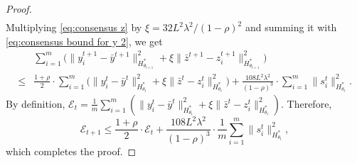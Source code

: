 \documentclass{article}
\theoremstyle{plain}
\theoremstyle{definition}
\theoremstyle{remark}
\newcommand{\sL}{L}
\newcommand{\cE}{\mathcal E}
\begin{document}
\begin{proof}
\begin{equation}
\begin{aligned}
        \end{aligned}
     \end{equation}
Multiplying \eqref{eq:consensus z} by $\xi=32\sL^2\lambda^2/(1-\rho)^2$ and summing it with \eqref{eq:consensus bound for y 2}, we get 
\begin{equation*} \begin{aligned}
     &{\sum}_{i=1}^m \Big(\|y_i^{t+1} - \bar y^{t+1}\|^2_{H_{\theta_{t+1}}^*} + \xi \|\bar z^{t+1} - z_i^{t+1}\|_{H_{\theta_{t+1}}^*}^2 \Big)\\[1mm] \leq & \frac{1+\rho}{2} \cdot {\sum}_{i=1}^m \Big(\|y_i^t - \bar y^t\|^2_{H_{\theta_t}^*} + \xi\|\bar z^{t} - z_i^{t}\|_{H_{\theta_{t}}^*}^2\Big) + \frac{108\sL^2\lambda^2}{(1-\rho)^{3}} \cdot  {\sum}_{i=1}^m\|s^t_i\|_{H_{\theta_t}^*}^2.
\end{aligned} \end{equation*}
By definition, $\cE_t=\frac1m {\sum}_{i=1}^m (\|y_i^t - \bar y^t\|^2_{H_{\theta_t}^*} + \xi\|\bar z^{t} - z_i^{t}\|_{H_{\theta_{t}}^*}^2)$. Therefore,
\begin{equation*}
      \cE_{t+1} \leq \frac{1+\rho}{2}\cdot \cE_t + \frac{108\sL^2\lambda^2}{(1-\rho)^{3}} \cdot \frac1m{\sum}_{i=1}^m\|s^t_i\|_{H_{\theta_t}^*}^2,
\end{equation*}
which completes the proof.
\end{proof}
\end{document}
